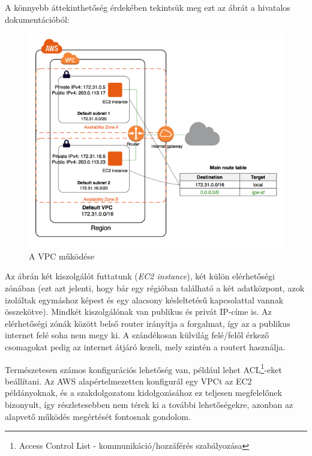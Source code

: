 A könnyebb áttekinthetőség érdekében tekintsük meg ezt az ábrát a hivatalos dokumentációból\cite{VPC}:
\newpage
\begin{figure}[!ht]
\centering
\includegraphics[width=150mm, keepaspectratio]{img/VPC.png}
\caption{A VPC működése}
\end{figure}
\vskip 0.1in
Az ábrán két kiszolgálót futtatunk (\textit{EC2 instance}), két külön elérhetőségi zónában (ezt azt jelenti, hogy bár egy régióban található a két adatközpont, azok izoláltak egymáshoz képest és egy alacsony késleltetésű kapcsolattal vannak összekötve). Mindkét kiszolgálónak van publikus és privát IP-címe is. Az elérhetőségi zónák között belső router irányítja a forgalmat, így az a publikus internet felé soha nem megy ki. A szándékosan külvilág felé/felől érkező csomagokat pedig az internet átjáró kezeli, mely szintén a routert használja.

Természetesen számos konfigurációs lehetőség van, például lehet ACL\footnote{Access Control List - kommunikáció/hozzáférés szabályozása}-eket beállítani. Az AWS alapértelmezetten konfigurál egy VPCt az EC2 példányoknak, és a szakdolgozatom kidolgozásához ez teljesen megfelelőnek bizonyult, így részletesebben nem térek ki a további lehetőségekre, azonban az alapvető működés megértését fontosnak gondolom.

